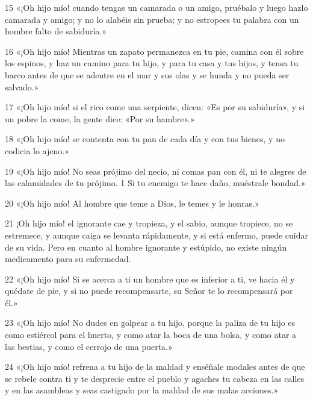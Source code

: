 \par 15 «¡Oh hijo mío! cuando tengas un camarada o un amigo, pruébalo y luego hazlo camarada y amigo; y no lo alabéis sin prueba; y no estropees tu palabra con un hombre falto de sabiduría.»

\par 16 «¡Oh hijo mío! Mientras un zapato permanezca en tu pie, camina con él sobre los espinos, y haz un camino para tu hijo, y para tu casa y tus hijos, y tensa tu barco antes de que se adentre en el mar y sus olas y se hunda y no pueda ser salvado.»

\par 17 «¡Oh hijo mío! si el rico come una serpiente, dicen: «Es por su sabiduría», y si un pobre la come, la gente dice: «Por su hambre».»

\par 18 «¡Oh hijo mío! se contenta con tu pan de cada día y con tus bienes, y no codicia lo ajeno.»

\par 19 «¡Oh hijo mío! No seas prójimo del necio, ni comas pan con él, ni te alegres de las calamidades de tu prójimo. 1 Si tu enemigo te hace daño, muéstrale bondad.»

\par 20 «¡Oh hijo mío! Al hombre que teme a Dios, le temes y le honras.»

\par 21 ¡Oh hijo mío! el ignorante cae y tropieza, y el sabio, aunque tropiece, no se estremece, y aunque caiga se levanta rápidamente, y si está enfermo, puede cuidar de su vida. Pero en cuanto al hombre ignorante y estúpido, no existe ningún medicamento para su enfermedad.

\par 22 «¡Oh hijo mío! Si se acerca a ti un hombre que es inferior a ti, ve hacia él y quédate de pie, y si no puede recompensarte, su Señor te lo recompensará por él.»

\par 23 «¡Oh hijo mío! No dudes en golpear a tu hijo, porque la paliza de tu hijo es como estiércol para el huerto, y como atar la boca de una bolsa, y como atar a las bestias, y como el cerrojo de una puerta.»

\par 24 «¡Oh hijo mío! refrena a tu hijo de la maldad y enséñale modales antes de que se rebele contra ti y te desprecie entre el pueblo y agaches tu cabeza en las calles y en las asambleas y seas castigado por la maldad de sus malas acciones.»

